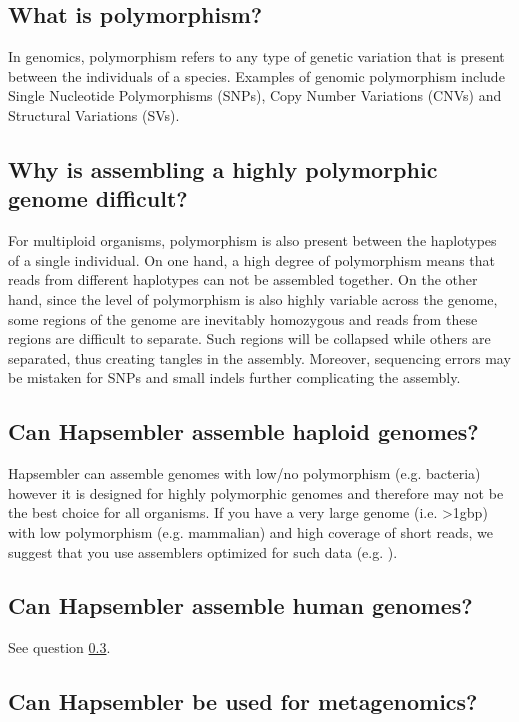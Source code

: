 \documentclass[12pt,a4paper]{report}
\begin{document}
\subsection{What is polymorphism?}

In genomics, polymorphism refers to any type of genetic variation that is present between the individuals of a species. Examples of genomic polymorphism include Single Nucleotide Polymorphisms (SNPs), Copy Number Variations (CNVs) and Structural Variations (SVs).

\subsection{Why is assembling a highly polymorphic genome difficult?}

For multiploid organisms, polymorphism is also present between the haplotypes of a single individual. On one hand, a high degree of polymorphism means that reads from different haplotypes can not be assembled together. On the other hand, since the level of polymorphism is also highly variable across the genome, some regions of the genome are inevitably homozygous and reads from these regions are difficult to separate. Such regions will be collapsed while others are separated, thus creating tangles in the assembly. Moreover, sequencing errors may be mistaken for SNPs and small indels further complicating the assembly.

\subsection{Can Hapsembler assemble haploid genomes?}
\label{haploid}

Hapsembler can assemble genomes with low/no polymorphism (e.g. bacteria) however it is designed for highly polymorphic genomes and therefore may not be the best choice for all organisms. If you have a very large genome (i.e. >1gbp) with low polymorphism (e.g. mammalian) and high coverage of short reads, we suggest that you use assemblers optimized for such data (e.g. \cite{simpson}).

\subsection{Can Hapsembler assemble human genomes?}

See question \ref{haploid}.

\subsection{Can Hapsembler be used for metagenomics?}
\end{document}
